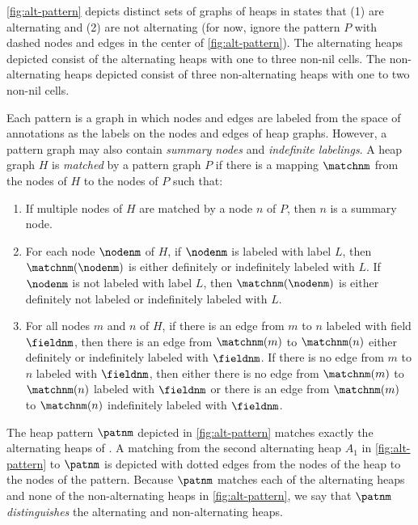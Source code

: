 \begin{ex}
  \label{ex:concrete-heaps}
  \autoref{fig:alt-pattern} depicts distinct sets of graphs of heaps
  in \altlist states that (1) are alternating and (2) are not
  alternating (for now, ignore the pattern $P$ with dashed nodes and
  edges in the center of \autoref{fig:alt-pattern}).
  The alternating heaps depicted consist of the alternating heaps with
  one to three non-nil cells.
  The non-alternating heaps depicted consist of three non-alternating
  heaps with one to two non-nil cells.
\end{ex}

Each pattern is a graph in which nodes and edges are labeled from the
space of annotations as the labels on the nodes and edges of heap
graphs.
%
However, a pattern graph may also contain \emph{summary nodes} and
\emph{indefinite labelings}.
%
A heap graph $H$ is \emph{matched} by a pattern graph $P$ if there is
a mapping $\matchnm$ from the nodes of $H$ to the nodes of $P$ such
that:
%
\begin{enumerate}
\item
  If multiple nodes of $H$ are matched by a node $n$ of $P$, then $n$
  is a summary node.
\item
  For each node $\nodenm$ of $H$, if $\nodenm$ is labeled with label $L$,
  then $\matchnm(\nodenm)$ is either definitely or indefinitely labeled
  with $L$.
  If $\nodenm$ is not labeled with label $L$, then $\matchnm(\nodenm)$
  is either definitely not labeled or indefinitely labeled with $L$.
\item
  For all nodes $m$ and $n$ of $H$, if there is an edge from $m$ to
  $n$ labeled with field $\fieldnm$, then there is an edge from
  $\matchnm(m)$ to $\matchnm(n)$ either definitely or indefinitely
  labeled with $\fieldnm$.
  If there is no edge from $m$ to $n$ labeled with $\fieldnm$, then
  either there is no edge from $\matchnm(m)$ to $\matchnm(n)$ labeled
  with $\fieldnm$ or there is an edge from $\matchnm(m)$ to
  $\matchnm(n)$ indefinitely labeled with $\fieldnm$.
\end{enumerate}

\begin{ex}
  \label{ex:heap-pats}
  The heap pattern $\patnm$ depicted in \autoref{fig:alt-pattern}
  matches exactly the alternating heaps of \altlist.
  A matching from the second alternating heap $A_1$ in
  \autoref{fig:alt-pattern} to $\patnm$ is depicted with dotted edges
  from the nodes of the heap to the nodes of the pattern.
  Because $\patnm$ matches each of the alternating heaps and none of
  the non-alternating heaps in \autoref{fig:alt-pattern}, we say that
  $\patnm$ \emph{distinguishes} the alternating and non-alternating
  heaps.
\end{ex}

